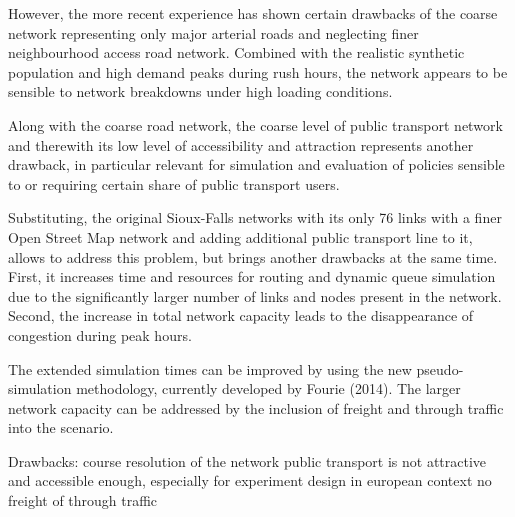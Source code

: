 However, the more recent experience has shown certain drawbacks of the coarse network representing only major arterial roads and neglecting finer neighbourhood access road network. Combined with the realistic synthetic population and high demand peaks during rush hours, the network appears to be sensible to network breakdowns under high loading conditions. 

Along with the coarse road network, the coarse level of public transport network and therewith its low level of accessibility and attraction represents another drawback, in particular relevant for simulation and evaluation of policies sensible to or requiring certain share of public transport users. 

Substituting, the original Sioux-Falls networks with its only 76 links with a finer Open Street Map network and adding additional public transport line to it, allows to address this problem, but brings another drawbacks at the same time. First, it increases time and resources for routing and dynamic queue simulation due to the significantly larger number of links and nodes present in the network. Second, the increase in total network capacity leads to the disappearance of congestion during peak hours.

The extended simulation times can be improved by using the new pseudo-simulation methodology, currently developed by Fourie (2014). The larger network capacity can be addressed by the inclusion of freight and through traffic into the scenario. 

Drawbacks: course resolution of the network
public transport is not attractive and accessible enough, especially for experiment design in european context
no freight of through traffic


